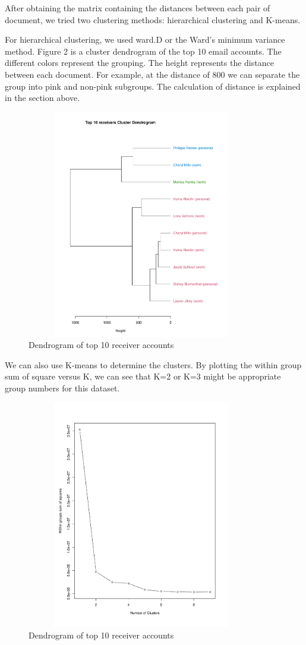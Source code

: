 After obtaining the matrix containing the distances between each pair of document, we tried two clustering methods: hierarchical clustering and K-means. 

For hierarchical clustering, we used ward.D or the Ward's minimum variance method. Figure 2 is a cluster dendrogram of the top 10 email accounts. The different colors represent the grouping. The height represents the distance between each document. For example, at the distance of 800 we can separate the group into pink and non-pink subgroups. The calculation of distance is explained in the section above.
\begin{figure}[h!]
    \centering
    \includegraphics[width=10cm,height=10cm]
    {daitong_and_yihe/clusterp.pdf}
    \caption{Dendrogram of top 10 receiver accounts}
\end{figure}

We can also use K-means to determine the clusters. By plotting the within group sum of square versus K, we can see that K=2 or K=3 might be appropriate group numbers for this dataset.
\begin{figure}[h!]
    \centering
    \includegraphics[width=10cm,height=10cm]
    {daitong_and_yihe/clusterd.pdf}
    \caption{Dendrogram of top 10 receiver accounts}
\end{figure}

